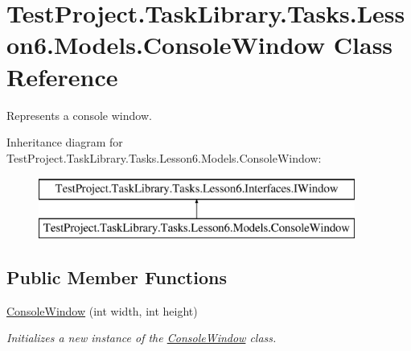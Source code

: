 \hypertarget{class_test_project_1_1_task_library_1_1_tasks_1_1_lesson6_1_1_models_1_1_console_window}{}\section{Test\+Project.\+Task\+Library.\+Tasks.\+Lesson6.\+Models.\+Console\+Window Class Reference}
\label{class_test_project_1_1_task_library_1_1_tasks_1_1_lesson6_1_1_models_1_1_console_window}


Represents a console window.  


Inheritance diagram for Test\+Project.\+Task\+Library.\+Tasks.\+Lesson6.\+Models.\+Console\+Window\+:\begin{figure}[H]
\begin{center}
\leavevmode
\includegraphics[height=2.000000cm]{class_test_project_1_1_task_library_1_1_tasks_1_1_lesson6_1_1_models_1_1_console_window}
\end{center}
\end{figure}
\subsection*{Public Member Functions}
\begin{DoxyCompactItemize}
\item 
\mbox{\hyperlink{class_test_project_1_1_task_library_1_1_tasks_1_1_lesson6_1_1_models_1_1_console_window_ae787b3b8f3edce88b42d939ee609a4b9}{Console\+Window}} (int width, int height)
\begin{DoxyCompactList}\small\item\em Initializes a new instance of the \mbox{\hyperlink{class_test_project_1_1_task_library_1_1_tasks_1_1_lesson6_1_1_models_1_1_console_window}{Console\+Window}} class. \end{DoxyCompactList}\end{DoxyCompactItemize}
